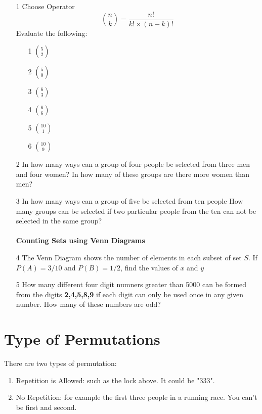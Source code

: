 \documentclass[12pt]{report}
\begin{document}
\begin{itemize}
	
	
	\item[1] Choose Operator
	\[ {n \choose k} = \frac{n!}{k! \times (n-k)!} \]
	Evaluate the following:
	\begin{multicols}{3}
		\begin{enumerate}
			\item[1] ${5 \choose 2}$
			\item[2] ${5 \choose 0}$
			\item[3] ${6 \choose 3}$
			\item[4] ${6 \choose 6}$
			\item[5] ${10 \choose 1}$
			\item[6] ${10 \choose 9}$
		\end{enumerate}        
	\end{multicols}
	\item[2] In how many ways can a group of four people be selected from three men and four women?
	In how many of these groups are there more women than men?
	\item[3] In how many ways can a group of five be selected from ten people
	How many groups can be selected if two particular people from the ten can not be selected in the same group?\\
	\\
	\textbf{Counting Sets using Venn Diagrams}
	\item[4] 
	The Venn Diagram shows the number of elements in each subset of set $S$.
	If $P(A) = 3/10$ and $P(B) = 1/2$, find the values of $x$ and $y$
	
	\item[5] How many different four digit numners greater than 5000 can be formed from the digits \textbf{2,4,5,8,9} if each digit can only be used once in any given number. How many of these numbers are odd?
\end{itemize}
	\section*{Type of Permutations}
		There are two types of permutation:
		\begin{enumerate}
			\item Repetition is Allowed: such as the lock above. It could be "333".
			\item No Repetition: for example the first three people in a running race. You can't be first and second.
		\end{enumerate}
		
\end{document}

